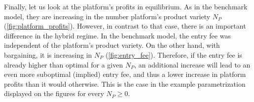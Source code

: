 \documentclass[a4paper]{article}
\begin{document}
Finally, let us look at the platform's profits in equilibrium.
As in the benchmark model, they are increasing in the number platform's product variety $N_P$ (\cref{fig:platform_profits}). %
However, in contrast to that case, there is an important difference in the hybrid regime.
In the benchmark model, the entry fee was independent of the platform's product variety.
On the other hand, with bargaining, it is increasing in $N_P$ (\cref{fig:entry_fee}).
Therefore, if the entry fee is already higher than optimal for a given $N_P$, an additional increase will lead to an even more suboptimal (implied) entry fee, and thus a lower increase in platform profits than it would otherwise.
This is the case in the example parametrization displayed on the figures for every $N_P \geq 0$.

\end{document}
